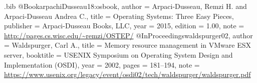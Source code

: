 \usepackage{filecontents}
\usepackage{tikz}
\usepackage{amsmath}
\usepackage{xurl} 
\usepackage{amsfonts}
\usepackage{ifthen}
\usepackage{shadow}
\usepackage{hhline}
\usepackage{tabularx}
\usepackage{fancyhdr}
\usepackage{etoolbox}
\usepackage[T1]{fontenc}
\usepackage{textcomp}
\usepackage{enumitem}
\usepackage{color}
\usepackage{colortbl}
\usepackage{enumitem}
\usepackage{cancel}
\usepackage{bbding}
\usepackage{booktabs}
\usepackage{multirow}
\usepackage{tabularx}
\usepackage{xcolor}
\usepackage{fontawesome5}
\usepackage{lipsum}
\usepackage{subcaption}
\usepackage{makecell}
\usepackage{todonotes} %

\begin{filecontents}{\jobname.bib}
@Book{arpachiDusseau18:osbook,
  author =       {Arpaci-Dusseau, Remzi H. and Arpaci-Dusseau Andrea C.},
  title =        {Operating Systems: Three Easy Pieces},
  publisher =    {Arpaci-Dusseau Books, LLC},
  year =         2015,
  edition =      {1.00},
  note =         {\url{http://pages.cs.wisc.edu/~remzi/OSTEP/}}
}
@InProceedings{waldspurger02,
  author =       {Waldspurger, Carl A.},
  title =        {Memory resource management in {VMware ESX} server},
  booktitle =    {USENIX Symposium on Operating System Design and
                  Implementation (OSDI)},
  year =         2002,
  pages =        {181--194},
  note =         {\url{https://www.usenix.org/legacy/event/osdi02/tech/waldspurger/waldspurger.pdf}}}
\end{filecontents}

\newcommand*\STAIF[0]{VAIF} %
\newcommand*\staif[0]{VAIF} %

\newenvironment{mycomment}{\begin{quote}\itshape\faComment\quad}{\end{quote}}
\newcommand{\mert}[1]{\todo[inline,color=green!20!white]{\textbf{Mert:} #1}}
\newcommand{\raja}[1]{\todo[inline,color=green!20!white]{\textbf{Mert:} #1}}

